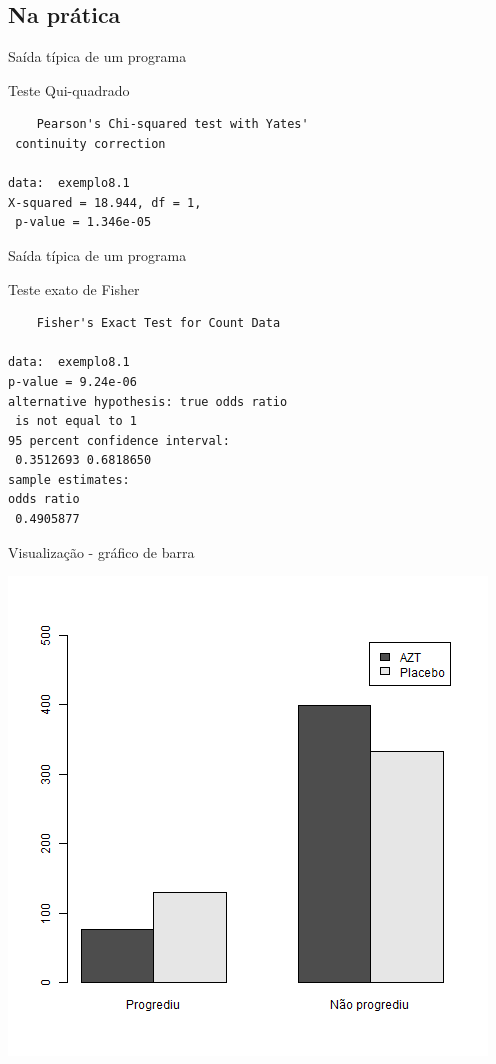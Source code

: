 \documentclass{beamer}
\begin{document}
\subsection{Na prática}


\begin{frame}[fragile]{\scriptsize Saída típica de um programa}
  \begin{block}{Teste Qui-quadrado}
    \scriptsize
\begin{verbatim}
	Pearson's Chi-squared test with Yates'
 continuity correction

data:  exemplo8.1
X-squared = 18.944, df = 1,
 p-value = 1.346e-05
\end{verbatim}
  \end{block}
\end{frame}

\begin{frame}[fragile]{\scriptsize Saída típica de um programa}
  \begin{block}{Teste exato de Fisher}
    \scriptsize
\begin{verbatim}
	Fisher's Exact Test for Count Data

data:  exemplo8.1
p-value = 9.24e-06
alternative hypothesis: true odds ratio
 is not equal to 1
95 percent confidence interval:
 0.3512693 0.6818650
sample estimates:
odds ratio
 0.4905877
\end{verbatim}
  \end{block}
\end{frame}

\begin{frame}{\scriptsize Visualização - gráfico de barra}
  \begin{center}
    \includegraphics[height=\textheight]{Cap26-27/barplot}
  \end{center}
\end{frame}
\end{document}
